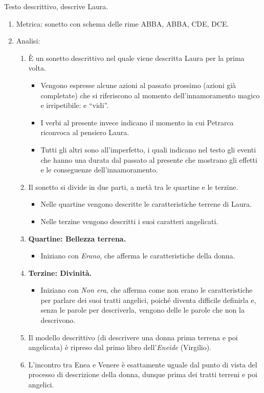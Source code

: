 \documentclass{article}
\begin{document}
Testo descrittivo, descrive Laura.

\begin{enumerate}
    \item Metrica: sonetto con schema delle rime ABBA, ABBA, CDE, DCE.

    \item Analisi:
        \begin{enumerate}[label=]
            \item È un sonetto descrittivo nel quale viene descritta Laura per la prima volta.
                \begin{itemize}
                    \item Vengono espresse alcune azioni al passato prossimo (azioni già completate) che si riferiscono al momento dell'innamoramento magico e irripetibile:   e ``vidi''.
                    \item I verbi al presente invece indicano il momento in cui Petrarca riconvoca al pensiero Laura.
                    \item Tutti gli altri sono all'imperfetto, i quali indicano nel testo gli eventi che hanno una durata dal passato al presente che mostrano gli effetti e le conseguenze dell'innamoramento.
                \end{itemize}
            \item Il sonetto si divide in due parti, a metà tra le quartine e le terzine.
                \begin{itemize}
                    \item Nelle quartine vengono descritte le caratteristiche terrene di Laura.
                    \item Nelle terzine vengono descritti i suoi caratteri angelicati.
                \end{itemize}
            \item \textbf{Quartine: Bellezza terrena.}
                \begin{itemize}
                    \item Iniziano con \textit{Erano}, che afferma le caratteristiche della donna.
                \end{itemize}
            \item \textbf{Terzine: Divinità.}
                \begin{itemize}
                    \item Iniziano con \textit{Non era}, che afferma come non erano le caratteristiche per parlare dei suoi tratti angelici, poiché diventa difficile definirla e, senza le parole per descriverla, vengono delle le parole che non la descrivono.
                \end{itemize}
            \item Il modello descrittivo (di descrivere una donna prima terrena e poi angelicata) è ripreso dal primo libro dell'\textit{Eneide} (Virgilio).
            \item L'incontro tra Enea e Venere è esattamente uguale dal punto di vista del processo di descrizione della donna, dunque prima dei tratti terreni e poi angelici.
        \end{enumerate}


\end{enumerate}
\end{document}
